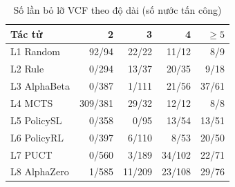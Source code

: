\begin{table}[H]
  \centering
  \small
  \caption{Số lần bỏ lỡ VCF theo độ dài (số nước tấn công)}
  \label{tab:cs-nuoc-vcf}
  \begin{tabular}{lrrrr}
    \toprule
    Tác tử & 2 & 3 & 4 & $\ge 5$ \\
    \midrule
    L1 Random & 92/94 & 22/22 & 11/12 & 8/9 \\
    L2 Rule & 0/294 & 13/37 & 20/35 & 9/18 \\
    L3 AlphaBeta & 0/387 & 1/111 & 21/56 & 37/61 \\
    L4 MCTS & 309/381 & 29/32 & 12/12 & 8/8 \\
    L5 PolicySL & 0/358 & 0/95 & 13/54 & 13/51 \\
    L6 PolicyRL & 0/397 & 6/110 & 8/53 & 20/50 \\
    L7 PUCT & 0/560 & 3/189 & 34/102 & 22/71 \\
    L8 AlphaZero & 1/585 & 11/209 & 23/108 & 29/76 \\
    \bottomrule
  \end{tabular}
\end{table}

